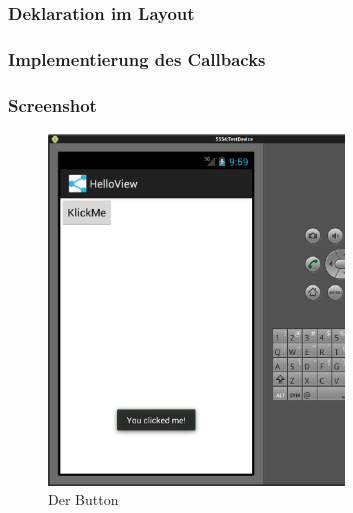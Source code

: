 \begin{frame}
   \frametitle{Deklaration im Layout}
	
\end{frame}

\begin{frame}
   \frametitle{Implementierung des Callbacks}
	
\end{frame}

\begin{frame}
   \frametitle{Screenshot}
	\begin{figure}[h!]
	  \centering
	  \includegraphics[width=0.7\textwidth]{pictures/button.ps}
	  \caption{
		  Der Button
	  }
	  \label{fig:button}
	\end{figure}
\end{frame}

